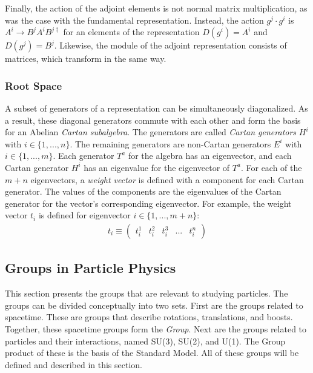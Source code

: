 Finally, the action of the adjoint elements is not normal matrix multiplication, as was the case with the fundamental representation.
Instead, the action $g^j\cdot g^i$ is $A^i\to B^jA^iB^{j\dagger}$ for an elements of the representation $D(g^i)=A^i$ and $D(g^j)=B^j$. \check
Likewise, the module of the adjoint representation consists of \nxn matrices, which transform in the same way.

\subsubsection{Root Space}
A subset of generators of a representation can be simultaneously diagonalized.
As a result, these diagonal generators commute with each other and form the basis for an Abelian \emph{Cartan subalgebra}.
The generators are called \emph{Cartan generators} $H^i$ with $i\in\{1,...,n\}$.
The remaining generators are non-Cartan generators $E^i$ with $i\in\{1,...,m\}$.
Each generator $T^a$ for the algebra has an eigenvector, and each Cartan generator $H^i$ has an eigenvalue for the eigenvector of $T^a$.
For each of the $m+n$ eigenvectors, a \emph{weight vector} is defined with a component for each Cartan generator.
The values of the components are the eigenvalues of the Cartan generator for the vector's corresponding eigenvector.
For example, the weight vector $t_i$ is defined for eigenvector $i\in\{1,...,m+n\}$:
\begin{equation}\begin{split}
t_i\equiv \begin{pmatrix}t_i^1&t_i^2&t_i^3&...&t_i^{n}\end{pmatrix}
\end{split}\end{equation} 

\subsection{Groups in Particle Physics}

This section presents the groups that are relevant to studying particles.
The groups can be divided conceptually into two sets.
First are the groups related to spacetime.
These are groups that describe rotations, translations, and boosts.
Together, these spacetime groups form the \emph{\poincare Group}.
Next are the groups related to particles and their interactions, named SU(3), SU(2), and U(1).
The Group product of these is the basis of the Standard Model.
All of these groups will be defined and described in this section.

